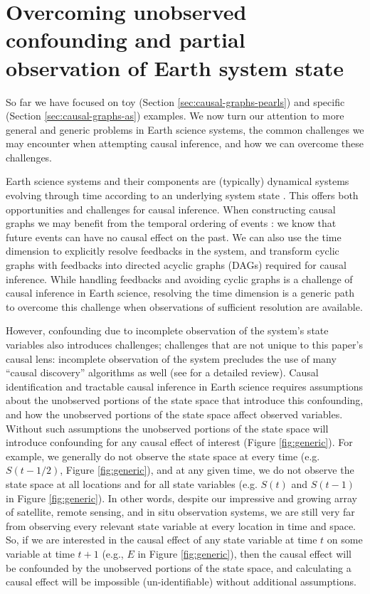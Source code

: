 \documentclass[12pt]{article}
\begin{document}
\section{Overcoming unobserved confounding and partial observation of Earth system state}
\label{sec:necess-cond-caus}

So far we have focused on toy (Section
\ref{sec:causal-graphs-pearls}) and specific (Section
\ref{sec:causal-graphs-as}) examples. We now turn our attention to
more general and generic problems in Earth science systems, the common
challenges we may encounter when attempting causal inference, and how
we can overcome these challenges.

Earth science systems and their components are (typically) dynamical
systems evolving through time according to an underlying system state
\citep{lorenz-1963,lorenz1996predictability,majda-state}. This offers
both opportunities and challenges for causal inference. When
constructing causal graphs we may benefit from the temporal ordering
of events \citep{runge2019inferring}: we know that future events can
have no causal effect on the past. We can also use the time dimension
to explicitly resolve feedbacks in the system, and transform cyclic
graphs with feedbacks into directed acyclic graphs (DAGs) required for
causal inference. While handling feedbacks and avoiding cyclic graphs
is a challenge of causal inference in Earth science, resolving the
time dimension is a generic path to overcome this challenge when
observations of sufficient resolution are available.

However, confounding due to incomplete observation of the system's
state variables also introduces challenges; challenges that are not
unique to this paper's causal lens: incomplete observation of the
system precludes the use of many ``causal discovery'' algorithms as
well (see \citet{runge2019inferring} for a detailed review). Causal
identification and tractable causal inference in Earth science
requires assumptions about the unobserved portions of the state space
that introduce this confounding, and how the unobserved portions of
the state space affect observed variables. Without such assumptions
the unobserved portions of the state space will introduce confounding
for any causal effect of interest (Figure \ref{fig:generic}). For
example, we generally do not observe the state space at every time
(e.g. $S(t-1/2)$, Figure \ref{fig:generic}), and at any given time, we
do not observe the state space at all locations and for all state
variables (e.g. $S(t)$ and $S(t-1)$ in Figure \ref{fig:generic}). In
other words, despite our impressive and growing array of satellite,
remote sensing, and in situ observation systems, we are still very far
from observing every relevant state variable at every location in time
and space.  So, if we are interested in the causal effect of any state
variable at time $t$ on some variable at time $t+1$ (e.g., $E$ in
Figure \ref{fig:generic}), then the causal effect will be confounded
by the unobserved portions of the state space, and calculating a
causal effect will be impossible (un-identifiable) without additional
assumptions.
\end{document}
